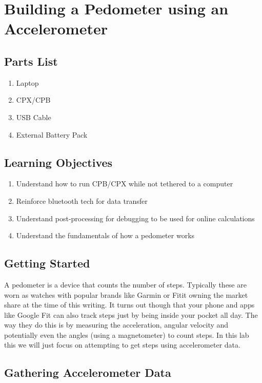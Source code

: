 \newpage

\section{Building a Pedometer using an Accelerometer}
\label{s:pendulum}

\subsection{Parts List}

\begin{enumerate}[itemsep=-5pt]
\item Laptop
\item CPX/CPB
\item USB Cable
\item External Battery Pack
\end{enumerate}

\subsection{Learning Objectives}
\begin{enumerate}[itemsep=-5pt]
\item Understand how to run CPB/CPX while not tethered to a computer
\item Reinforce bluetooth tech for data transfer
\item Understand post-processing for debugging to be used for online calculations
\item Understand the fundamentals of how a pedometer works
\end{enumerate}

\subsection{Getting Started}

A pedometer is a device that counts the number of steps. Typically
these are worn as watches with popular brands like Garmin or Fitit
owning the market share at the time of this writing. It turns out
though that your phone and apps like Google Fit can also track steps
just by being inside your pocket all day. The way they do this is by
measuring the acceleration, angular velocity and potentially even the
angles (using a magnetometer) to count steps. In this lab this we will
just focus on attempting to get steps using accelerometer data.  

\subsection{Gathering Accelerometer Data}

